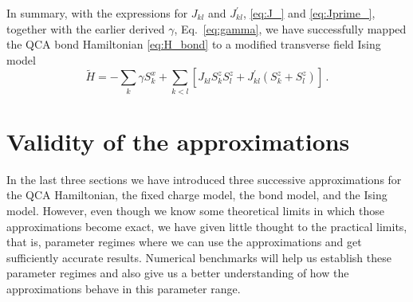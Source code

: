 In summary, with the expressions for $J_{kl}$ and $J^{\prime}_{kl}$,
\eqref{eq:J_} and \eqref{eq:Jprime_}, together with the earlier derived
$\gamma$, Eq.~\eqref{eq:gamma}, we have successfully mapped the QCA bond
Hamiltonian \eqref{eq:H_bond} to a modified transverse field Ising model
\begin{equation}
  \label{eq:H_Ising}
  \tilde{H}
  =
  - \sum_k \gamma S^x_k
  + \sum_{k<l}
    \left[
      J_{kl} S^z_k S^z_l + 
      J^{\prime}_{kl} \left( S^z_k + S^z_l \right)
    \right] \, .
\end{equation}


\section{Validity of the approximations}

In the last three sections we have introduced three successive approximations
for the QCA Hamiltonian, the fixed charge model, the bond model, and the Ising
model. However, even though we know some theoretical limits in which those
approximations become exact, we have given little thought to the practical
limits, that is, parameter regimes where we can use the approximations
and get sufficiently accurate results. Numerical benchmarks will help us
establish these parameter regimes and also give us a better understanding of how
the approximations behave in this parameter range.

